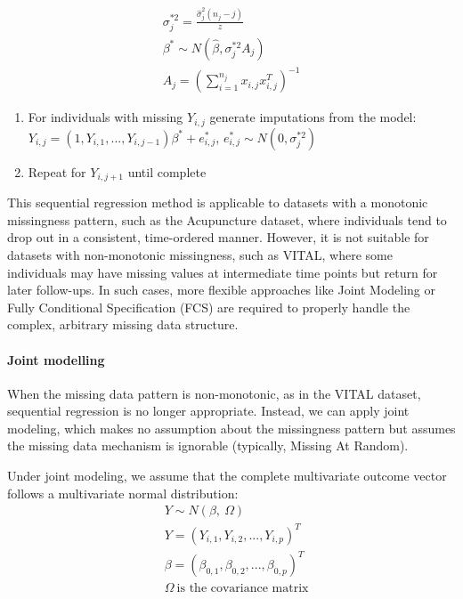 \documentclass{article}
\begin{document}
\begin{align*}
   \sigma_j^{*2} = \frac{\hat{\sigma}_j^2 (n_j - j)}{z} \\
   \beta^* \sim N(\hat{\beta}, \sigma_j^{*2} A_j) \\
   A_j = (\sum_{i=1}^{n_j} x_{i,j} x_{i,j}^T)^{-1}
   \end{align*}

\begin{enumerate}
\def\labelenumi{\arabic{enumi}.}
\setcounter{enumi}{3}
\item
  For individuals with missing \(Y_{i,j}\) generate imputations from the
  model:
  \(Y_{i,j} = (1,Y_{i,1},...,Y_{i,j-1}) \beta^{*} + e^{*}_{i,j}\),
  \(e_{i,j}^{*} \sim{N} (0,\sigma^{*2}_{j})\)
\item
  Repeat for \(Y_{i,j+1}\) until complete
\end{enumerate}

This sequential regression method is applicable to datasets with a
monotonic missingness pattern, such as the Acupuncture dataset, where
individuals tend to drop out in a consistent, time-ordered manner.
However, it is not suitable for datasets with non-monotonic missingness,
such as VITAL, where some individuals may have missing values at
intermediate time points but return for later follow-ups. In such cases,
more flexible approaches like Joint Modeling or Fully Conditional
Specification (FCS) are required to properly handle the complex,
arbitrary missing data structure.

\paragraph{Joint modelling}\label{joint-modelling}

When the missing data pattern is non-monotonic, as in the VITAL dataset,
sequential regression is no longer appropriate. Instead, we can apply
joint modeling, which makes no assumption about the missingness pattern
but assumes the missing data mechanism is ignorable (typically, Missing
At Random).

Under joint modeling, we assume that the complete multivariate outcome
vector follows a multivariate normal distribution: \begin{align*}
    & Y \sim N(\beta,\ \Omega) \\
    & Y = (Y_{i,1},Y_{i,2},...,Y_{i,p})^{T} \\
    & \beta = (\beta_{0,1},\beta_{0,2},...,\beta_{0,p})^{T} \\
    & \Omega \ \text{is the covariance matrix}
    \end{align*}
\end{document}
